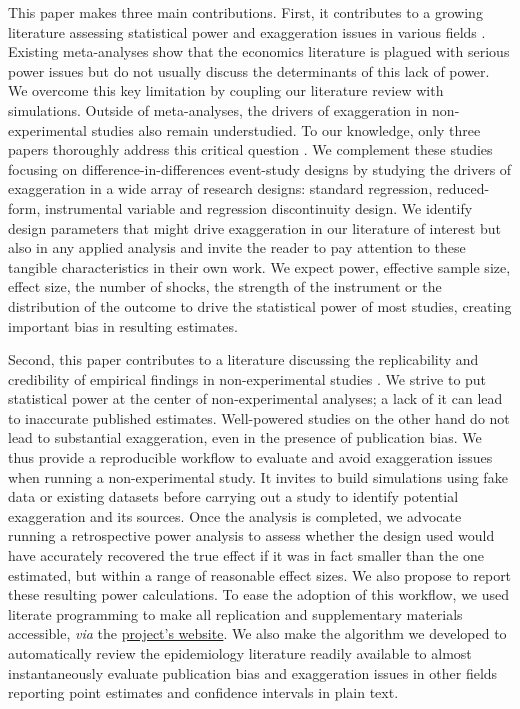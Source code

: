 \documentclass[12pt]{article}
\begin{document}
    This paper makes three main contributions. First, it contributes to a growing literature assessing statistical power and exaggeration issues in various fields \citep{ioannidis_why_2008, gelman_beyond_2014, ioannidis_power_2017, ferraro_featureis_2020, stommesReliability2023, arel_bundock_quantitative_2022}. Existing meta-analyses show that the economics literature is plagued with serious power issues but do not usually discuss the determinants of this lack of power. We overcome this key limitation by coupling our literature review with simulations. Outside of meta-analyses, the drivers of exaggeration in non-experimental studies also remain understudied. To our knowledge, only three papers thoroughly address this critical question \citep{schell_evaluating_2018, griffin_moving_2021, black_simulated_2022}. We complement these studies focusing on difference-in-differences event-study designs by studying the drivers of exaggeration in a wide array of research designs: standard regression, reduced-form, instrumental variable and regression discontinuity design. We identify design parameters that might drive exaggeration in our literature of interest but also in any applied analysis and invite the reader to pay attention to these tangible characteristics in their own work. We expect power, effective sample size, effect size, the number of shocks, the strength of the instrument or the distribution of the outcome to drive the statistical power of most studies, creating important bias in resulting estimates. 

    Second, this paper contributes to a literature discussing the replicability and credibility of empirical findings in non-experimental studies \citep[for instance]{button_power_2013, open_science_collaboration_estimating_2015, camerer_evaluating_2018, brodeur_methods_2020}. We strive to put statistical power at the center of non-experimental analyses; a lack of it can lead to inaccurate published estimates. Well-powered studies on the other hand do not lead to substantial exaggeration, even in the presence of publication bias. We thus provide a reproducible workflow to evaluate and avoid exaggeration issues when running a non-experimental study. It invites to build simulations using fake data or existing datasets before carrying out a study to identify potential exaggeration and its sources. Once the analysis is completed, we advocate running a retrospective power analysis to assess whether the design used would have accurately recovered the true effect if it was in fact smaller than the one estimated, but  within a range of reasonable effect sizes. We also propose to report these resulting power calculations. To ease the adoption of this workflow, we used literate programming to make all replication and supplementary materials accessible, \textit{via} the \href{https://vincentbagilet.github.io/inference_pollution/}{project's website}. We also make the algorithm we developed to automatically review the epidemiology literature readily available to almost instantaneously evaluate publication bias and exaggeration issues in other fields reporting point estimates and confidence intervals in plain text.
\end{document}
